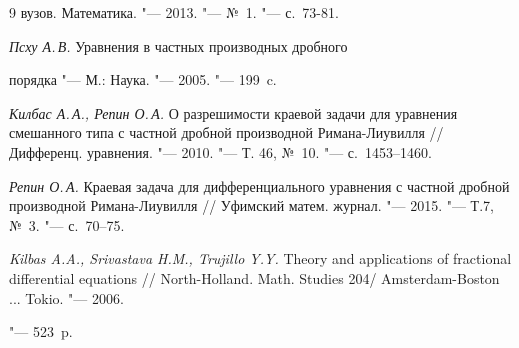 \begin{thebibliography}{9}
вузов. Математика. "--- 2013. "--- №~1. "--- с.~73-81.





\emph{Псху А.\,В.} Уравнения в частных производных дробного

порядка "--- М.: Наука. "--- 2005. "--- 199~c.





\emph{Килбас А.\,А., Репин О.\,А.} О разрешимости краевой задачи для уравнения смешанного типа с частной дробной производной Римана-Лиувилля /\!/ Дифференц. уравнения. "--- 2010. "--- Т. 46, №~10. "--- с.~1453--1460.





\emph{Репин О.\,А.} Краевая задача для дифференциального уравнения с частной дробной производной Римана-Лиувилля /\!/ Уфимский матем. журнал. "---   2015. "---  Т.7, №~3. "---  с.~70--75.





\emph{Kilbas A.A., Srivastava H.M., Trujillo Y.Y. } Theory and applications of fractional differential equations /\!/ North-Holland. Math. Studies 204/ Amsterdam-Boston ... Tokio. "---  2006.

"--- 523~p.



\end{thebibliography}








%


%



